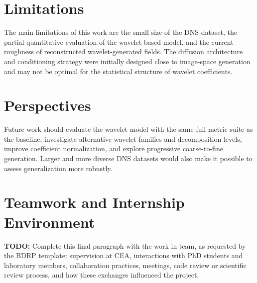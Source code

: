 \section{Limitations}

The main limitations of this work are the small size of the DNS dataset, the partial quantitative evaluation of the wavelet-based model, and the current roughness of reconstructed wavelet-generated fields. The diffusion architecture and conditioning strategy were initially designed close to image-space generation and may not be optimal for the statistical structure of wavelet coefficients.

\section{Perspectives}

Future work should evaluate the wavelet model with the same full metric suite as the baseline, investigate alternative wavelet families and decomposition levels, improve coefficient normalization, and explore progressive coarse-to-fine generation. Larger and more diverse DNS datasets would also make it possible to assess generalization more robustly.

\section{Teamwork and Internship Environment}

\textbf{TODO:} Complete this final paragraph with the work in team, as requested by the BDRP template: supervision at CEA, interactions with PhD students and laboratory members, collaboration practices, meetings, code review or scientific review process, and how these exchanges influenced the project.
